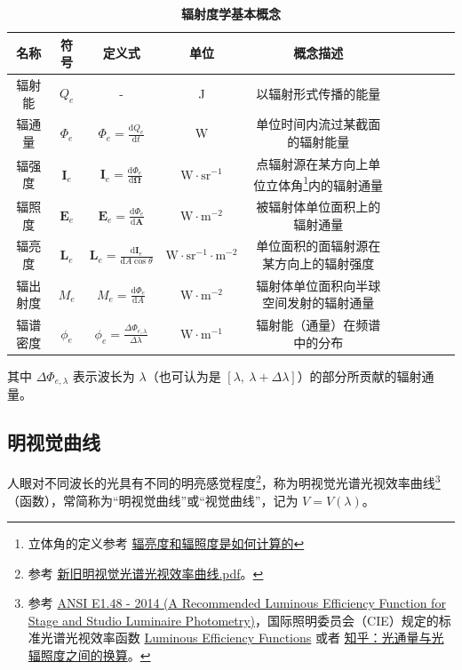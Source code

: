 \documentclass[UTF8]{report}
\theoremstyle{MyLineTheoremStyle} %
\theoremstyle{MyBlockTheoremStyle} %
\theoremstyle{MySubsubsectionStyle} %
\begin{document}
\begin{table}[H]\centering
    \caption{\textbf{辐射度学基本概念}}
    \label{辐射度学基本概念}
    \renewcommand{\arraystretch}{1.1} %
\begin{tabular}{|c|c|c|c|c|c|c|c|c|c|}\hline
    名称 & 符号& 定义式 & 单位 & 概念描述\\
    \hline
    辐射能 & $Q_e$ & - & J & 以辐射形式传播的能量 \\
    \hline
    辐通量 & $\Phi_e$ & $\Phi_e = \frac{\mathrm{d}Q_e}{\mathrm{d}t}$ & W & 单位时间内流过某截面的辐射能量 \\
    \hline
    辐强度 & $\boldsymbol{I}_e$ & $\boldsymbol{I}_e = \frac{\mathrm{d}\Phi_e }{\mathrm{d} \boldsymbol{\Omega} } $ & $\mathrm{W\cdot sr^{-1}}$ & 点辐射源在某方向上单位立体角\footnote{立体角的定义参考 \href{https://www.zhihu.com/question/611533175/answer/3244345528}{辐亮度和辐照度是如何计算的}}内的辐射通量 \\
    \hline
    辐照度 & $\boldsymbol{E}_e$ & $ \boldsymbol{E}_e = \frac{\mathrm{d}\Phi_e}{\mathrm{d}\boldsymbol{A}}$ & $\mathrm{W\cdot m^{-2}}$ & 被辐射体单位面积上的辐射通量 \\
    \hline
    辐亮度 & $\boldsymbol{L}_e$ & $\boldsymbol{L}_e = \frac{\mathrm{d}\boldsymbol{I}_e}{\mathrm{d}A \cos \theta} $ & $\mathrm{\mathrm{W}\cdot sr^{-1}\cdot m^{-2}}$ & 单位面积的面辐射源在某方向上的辐射强度\\
    \hline
    辐出射度 & $M_e$ & $ M_e = \frac{\mathrm{d}\Phi_e}{\mathrm{d}A}$ & $\mathrm{W\cdot m^{-2}} $ & 辐射体单位面积向半球空间发射的辐射通量 \\
    \hline
    辐谱密度 & $\phi_e$ & $\phi_e = \frac{\Delta \Phi_{e,\lambda}}{ \Delta\lambda} $ & $\mathrm{W\cdot m^{-1}} $ & 辐射能（通量）在频谱中的分布 \\
    \hline
\end{tabular}
\end{table}

其中 $\Delta \Phi_{e,\lambda}$ 表示波长为 $\lambda$（也可认为是 $[\lambda,\ \lambda + \Delta \lambda]$）的部分所贡献的辐射通量。

\subsection{明视觉曲线}

人眼对不同波长的光具有不同的明亮感觉程度\footnote{参考 \href{https://www.writebug.com/static/uploads/2024/9/16/09153f4fce1d2b99e38c19ef9deeda44.pdf}{新旧明视觉光谱光视效率曲线.pdf}。}，称为明视觉光谱光视效率曲线\footnote{参考 \href{https://webstore.ansi.org/preview-pages/ESTA/preview_E1-48_2014.pdf}{ANSI E1.48 - 2014 (A Recommended Luminous Efficiency Function for Stage and Studio Luminaire Photometry)}，国际照明委员会（CIE）规定的标准光谱光视效率函数 \href{https://rdrr.io/cran/colorSpec/man/luminsivity.html}{Luminous Efficiency Functions} 或者 \href{https://www.zhihu.com/question/400643965/answer/2727547334}{知乎：光通量与光辐照度之间的换算}。}（函数），常简称为“明视觉曲线”或“视觉曲线”，记为 $V = V(\lambda)$。
\end{document}
